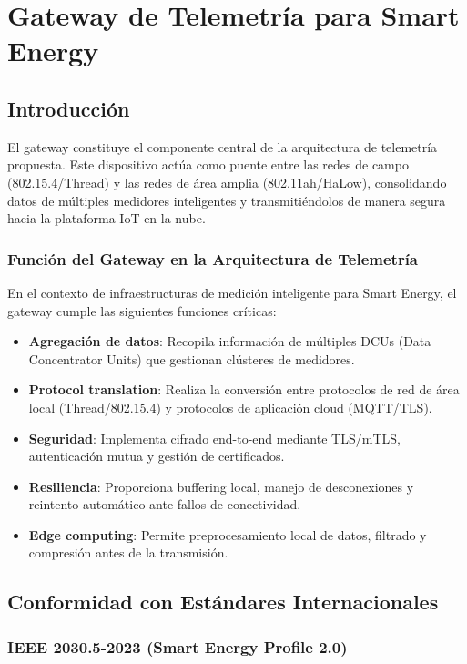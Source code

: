 ﻿\chapter{Gateway de Telemetría para Smart Energy}

\section{Introducción}

El gateway constituye el componente central de la arquitectura de telemetría propuesta. Este dispositivo actúa como puente entre las redes de campo (802.15.4/Thread) y las redes de área amplia (802.11ah/HaLow), consolidando datos de múltiples medidores inteligentes y transmitiéndolos de manera segura hacia la plataforma IoT en la nube.

\subsection{Función del Gateway en la Arquitectura de Telemetría}

En el contexto de infraestructuras de medición inteligente para Smart Energy, el gateway cumple las siguientes funciones críticas:

\begin{itemize}
    \item \textbf{Agregación de datos}: Recopila información de múltiples DCUs (Data Concentrator Units) que gestionan clústeres de medidores.
    \item \textbf{Protocol translation}: Realiza la conversión entre protocolos de red de área local (Thread/802.15.4) y protocolos de aplicación cloud (MQTT/TLS).
    \item \textbf{Seguridad}: Implementa cifrado end-to-end mediante TLS/mTLS, autenticación mutua y gestión de certificados.
    \item \textbf{Resiliencia}: Proporciona buffering local, manejo de desconexiones y reintento automático ante fallos de conectividad.
    \item \textbf{Edge computing}: Permite preprocesamiento local de datos, filtrado y compresión antes de la transmisión.
\end{itemize}

\section{Conformidad con Estándares Internacionales}

\subsection{IEEE 2030.5-2023 (Smart Energy Profile 2.0)}

